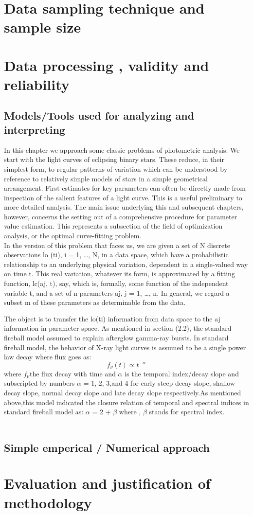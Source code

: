 \section{Data sampling technique and sample size}
\section{Data  processing , validity and reliability }
\subsection{Models/Tools used for analyzing and interpreting}
In this chapter we approach some classic problems of photometric analysis. We start with the light curves of eclipsing binary stars. These reduce, in their simplest form, to regular patterns of variation which can be understood by reference to relatively simple models of stars in a simple geometrical arrangement. First estimates for key parameters can often be directly made from inspection of the salient features of a light curve. This is a useful preliminary to more detailed analysis. The main issue underlying this and subsequent chapters, however, concerns the setting out of a comprehensive procedure for parameter value estimation. This represents a subsection of the field of optimization analysis, or the optimal curve-fitting problem.\\
In the version of this problem that faces us, we are given a set of N discrete observations lo (ti), i = 1, …, N, in a data space, which have a probabilistic relationship to an underlying physical variation, dependent in a single-valued way on time t. This real variation, whatever its form, is approximated by a fitting function, lc(aj, t), say, which is, formally, some function of the independent variable t, and a set of n parameters aj, j = 1, …, n. In general, we regard a subset m of these parameters as determinable from the data.

The object is to transfer the lo(ti) information from data space to the aj information in parameter space.
As mentioned in section (2.2), the  standard fireball model assumed to explain afterglow gamma-ray bursts. In standard fireball model, the behavior of X-ray light curves is assumed to be a single power law decay where flux goes as:
\begin{equation}
f_{\nu}(t)\propto  t^{-\alpha} 
\end{equation}
where  $f_{\nu} $the flux decay with time and  $ \alpha  $ is the temporal index/decay slope and subscripted by numbers  $ \alpha $ = 1, 2, 3,and 4 for early steep decay slope, shallow decay slope, normal decay slope and late decay slope respectively.As mentioned above,this model  indicated the closure relation of temporal and spectral indices  in standard fireball model as:
 $\alpha$ = 2 + $\beta$ where , $\beta $ stands for spectral index.\\\\  
\subsection{Simple emperical / Numerical approach}
\section{Evaluation and justification of  methodology }
